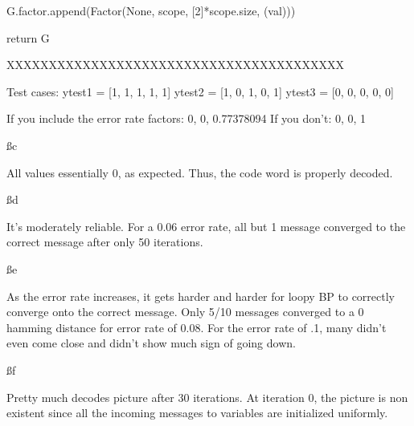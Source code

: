         G.factor.append(Factor(None, scope, [2]*scope.size, (val)))

    return G
    
XXXXXXXXXXXXXXXXXXXXXXXXXXXXXXXXXXXXXXXX

Test cases:
ytest1 = [1, 1, 1, 1, 1]
ytest2 = [1, 0, 1, 0, 1]
ytest3 = [0, 0, 0, 0, 0]

If you include the error rate factors:
0, 0, 0.77378094
If you don't: 
0, 0, 1

\ss c

All values essentially 0, as expected. Thus, the code word is properly decoded.


\ss d

It's moderately reliable. For a 0.06 error rate, all but 1 message converged to the correct message after only 50 iterations.


\ss e

As the error rate increases, it gets harder and harder for loopy BP to correctly converge onto the correct message. Only 5/10 messages converged to a 0 hamming distance for error rate of 0.08. For the error rate of .1, many didn't even come close and didn't show much sign of going down.


\ss f

Pretty much decodes picture after 30 iterations. At iteration 0, the picture is non existent since all the incoming messages to variables are initialized uniformly.


